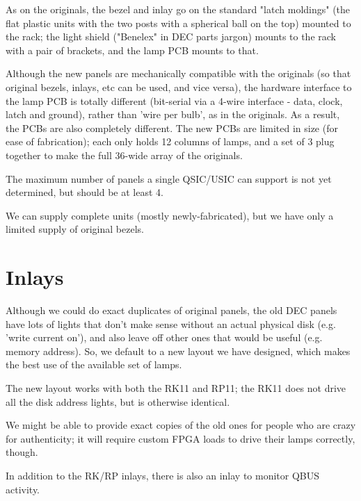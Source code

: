 As on the originals, the bezel and inlay go on the standard "latch moldings"
(the flat plastic units with the two posts with a spherical ball on the top)
mounted to the rack; the light shield ("Benelex" in DEC parts jargon) mounts
to the rack with a pair of brackets, and the lamp PCB mounts to that.

Although the new panels are mechanically compatible with the originals (so
that original bezels, inlays, etc can be used, and vice versa), the hardware
interface to the lamp PCB is totally different (bit-serial via a 4-wire
interface - data, clock, latch and ground), rather than 'wire per bulb', as
in the originals. As a result, the PCBs are also completely different. The
new PCBs are limited in size (for ease of fabrication); each only holds 12
columns of lamps, and a set of 3 plug together to make the full 36-wide array
of the originals.

The maximum number of panels a single QSIC/USIC can support is not yet
determined, but should be at least 4.

We can supply complete units (mostly newly-fabricated), but we have only a
limited supply of original bezels.

\section{Inlays}

Although we could do exact duplicates of original panels, the old DEC panels
have lots of lights that don't make sense without an actual physical disk
(e.g. 'write current on'), and also leave off other ones that would be useful
(e.g. memory address). So, we default to a new layout we have designed, which
makes the best use of the available set of lamps.

The new layout works with both the RK11 and RP11; the RK11 does not drive all
the disk address lights, but is otherwise identical.

We might be able to provide exact copies of the old ones for people who are
crazy for authenticity; it will require custom FPGA loads to drive their
lamps correctly, though.

In addition to the RK/RP inlays, there is also an inlay to monitor QBUS
activity.

